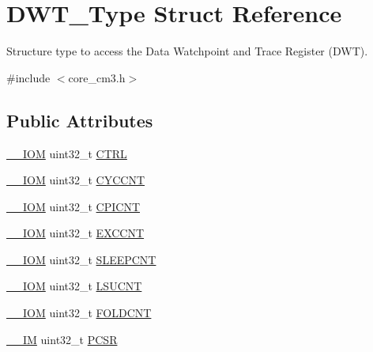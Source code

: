 \hypertarget{struct_d_w_t___type}{}\section{D\+W\+T\+\_\+\+Type Struct Reference}
\label{struct_d_w_t___type}


Structure type to access the Data Watchpoint and Trace Register (D\+WT).  




{\ttfamily \#include $<$core\+\_\+cm3.\+h$>$}

\subsection*{Public Attributes}
\begin{DoxyCompactItemize}
\item 
\hyperlink{core__sc300_8h_ab6caba5853a60a17e8e04499b52bf691}{\+\_\+\+\_\+\+I\+OM} uint32\+\_\+t \hyperlink{struct_d_w_t___type_add790c53410023b3b581919bb681fe2a}{C\+T\+RL}
\item 
\hyperlink{core__sc300_8h_ab6caba5853a60a17e8e04499b52bf691}{\+\_\+\+\_\+\+I\+OM} uint32\+\_\+t \hyperlink{struct_d_w_t___type_a102eaa529d9098242851cb57c52b42d9}{C\+Y\+C\+C\+NT}
\item 
\hyperlink{core__sc300_8h_ab6caba5853a60a17e8e04499b52bf691}{\+\_\+\+\_\+\+I\+OM} uint32\+\_\+t \hyperlink{struct_d_w_t___type_a2c08096c82abe245c0fa97badc458154}{C\+P\+I\+C\+NT}
\item 
\hyperlink{core__sc300_8h_ab6caba5853a60a17e8e04499b52bf691}{\+\_\+\+\_\+\+I\+OM} uint32\+\_\+t \hyperlink{struct_d_w_t___type_a9fe20c16c5167ca61486caf6832686d1}{E\+X\+C\+C\+NT}
\item 
\hyperlink{core__sc300_8h_ab6caba5853a60a17e8e04499b52bf691}{\+\_\+\+\_\+\+I\+OM} uint32\+\_\+t \hyperlink{struct_d_w_t___type_a416a54e2084ce66e5ca74f152a5ecc70}{S\+L\+E\+E\+P\+C\+NT}
\item 
\hyperlink{core__sc300_8h_ab6caba5853a60a17e8e04499b52bf691}{\+\_\+\+\_\+\+I\+OM} uint32\+\_\+t \hyperlink{struct_d_w_t___type_acc05d89bdb1b4fe2fa499920ec02d0b1}{L\+S\+U\+C\+NT}
\item 
\hyperlink{core__sc300_8h_ab6caba5853a60a17e8e04499b52bf691}{\+\_\+\+\_\+\+I\+OM} uint32\+\_\+t \hyperlink{struct_d_w_t___type_a1cfc48384ebd8fd8fb7e5d955aae6c97}{F\+O\+L\+D\+C\+NT}
\item 
\hyperlink{core__sc300_8h_a4cc1649793116d7c2d8afce7a4ffce43}{\+\_\+\+\_\+\+IM} uint32\+\_\+t \hyperlink{struct_d_w_t___type_a6353ca1d1ad9bc1be05d3b5632960113}{P\+C\+SR}

\end{DoxyCompactItemize}
